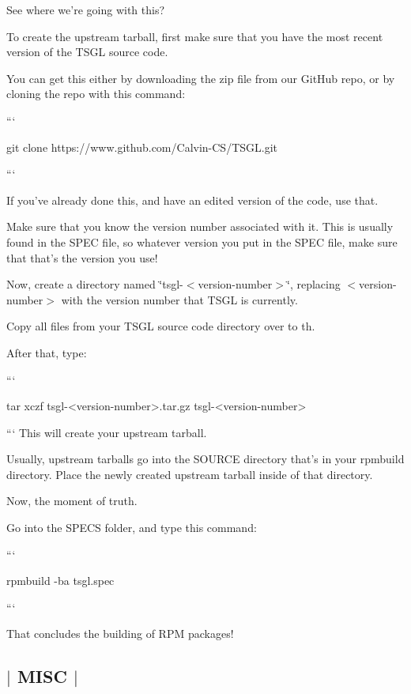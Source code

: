 See where we're going with this?

To create the upstream tarball, first make sure that you have the most recent version of the T\-S\-G\-L source code.

You can get this either by downloading the zip file from our Git\-Hub repo, or by cloning the repo with this command\-:

``` \begin{DoxyVerb}git clone https://www.github.com/Calvin-CS/TSGL.git
\end{DoxyVerb}


```

If you've already done this, and have an edited version of the code, use that.

Make sure that you know the version number associated with it. This is usually found in the S\-P\-E\-C file, so whatever version you put in the S\-P\-E\-C file, make sure that that's the version you use!

Now, create a directory named \char`\"{}tsgl-\/$<$version-\/number$>$\char`\"{}, replacing $<$version-\/number$>$ with the version number that T\-S\-G\-L is currently.

Copy all files from your T\-S\-G\-L source code directory over to th.

After that, type\-:

``` \begin{DoxyVerb}tar xczf tsgl-<version-number>.tar.gz tsgl-<version-number>
\end{DoxyVerb}


``` This will create your upstream tarball.

Usually, upstream tarballs go into the S\-O\-U\-R\-C\-E directory that's in your rpmbuild directory. Place the newly created upstream tarball inside of that directory.

Now, the moment of truth.

Go into the S\-P\-E\-C\-S folder, and type this command\-:

``` \begin{DoxyVerb}rpmbuild -ba tsgl.spec
\end{DoxyVerb}


```

That concludes the building of R\-P\-M packages! 

 \subsection*{$\vert$ M\-I\-S\-C $\vert$ }

